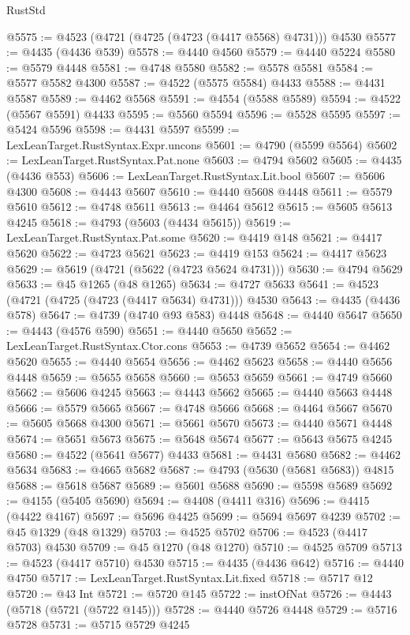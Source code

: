 \begin{lexlean}{RustStd}
\begin{coremodule}
@5575 := @4523 (@4721 (@4725 (@4723 (@4417 @5568) @4731))) @4530
@5577 := @4435 (@4436 @539)
@5578 := @4440 @4560
@5579 := @4440 @5224
@5580 := @5579 @4448
@5581 := @4748 @5580
@5582 := @5578 @5581
@5584 := @5577 @5582 @4300
@5587 := @4522 (@5575 @5584) @4433
@5588 := @4431 @5587
@5589 := @4462 @5568
@5591 := @4554 (@5588 @5589)
@5594 := @4522 (@5567 @5591) @4433
@5595 := @5560 @5594
@5596 := @5528 @5595
@5597 := @5424 @5596
@5598 := @4431 @5597
@5599 := LexLeanTarget.RustSyntax.Expr.uncons
@5601 := @4790 (@5599 @5564)
@5602 := LexLeanTarget.RustSyntax.Pat.none
@5603 := @4794 @5602
@5605 := @4435 (@4436 @553)
@5606 := LexLeanTarget.RustSyntax.Lit.bool
@5607 := @5606 @4300
@5608 := @4443 @5607
@5610 := @4440 @5608 @4448
@5611 := @5579 @5610
@5612 := @4748 @5611
@5613 := @4464 @5612
@5615 := @5605 @5613 @4245
@5618 := @4793 (@5603 (@4434 @5615))
@5619 := LexLeanTarget.RustSyntax.Pat.some
@5620 := @4419 @148
@5621 := @4417 @5620
@5622 := @4723 @5621
@5623 := @4419 @153
@5624 := @4417 @5623
@5629 := @5619 (@4721 (@5622 (@4723 @5624 @4731)))
@5630 := @4794 @5629
@5633 := @45 @1265 (@48 @1265)
@5634 := @4727 @5633
@5641 := @4523 (@4721 (@4725 (@4723 (@4417 @5634) @4731))) @4530
@5643 := @4435 (@4436 @578)
@5647 := @4739 (@4740 @93 @583) @4448
@5648 := @4440 @5647
@5650 := @4443 (@4576 @590)
@5651 := @4440 @5650
@5652 := LexLeanTarget.RustSyntax.Ctor.cons
@5653 := @4739 @5652
@5654 := @4462 @5620
@5655 := @4440 @5654
@5656 := @4462 @5623
@5658 := @4440 @5656 @4448
@5659 := @5655 @5658
@5660 := @5653 @5659
@5661 := @4749 @5660
@5662 := @5606 @4245
@5663 := @4443 @5662
@5665 := @4440 @5663 @4448
@5666 := @5579 @5665
@5667 := @4748 @5666
@5668 := @4464 @5667
@5670 := @5605 @5668 @4300
@5671 := @5661 @5670
@5673 := @4440 @5671 @4448
@5674 := @5651 @5673
@5675 := @5648 @5674
@5677 := @5643 @5675 @4245
@5680 := @4522 (@5641 @5677) @4433
@5681 := @4431 @5680
@5682 := @4462 @5634
@5683 := @4665 @5682
@5687 := @4793 (@5630 (@5681 @5683)) @4815
@5688 := @5618 @5687
@5689 := @5601 @5688
@5690 := @5598 @5689
@5692 := @4155 (@5405 @5690)
@5694 := @4408 (@4411 @316)
@5696 := @4415 (@4422 @4167)
@5697 := @5696 @4425
@5699 := @5694 @5697 @4239
@5702 := @45 @1329 (@48 @1329)
@5703 := @4525 @5702
@5706 := @4523 (@4417 @5703) @4530
@5709 := @45 @1270 (@48 @1270)
@5710 := @4525 @5709
@5713 := @4523 (@4417 @5710) @4530
@5715 := @4435 (@4436 @642)
@5716 := @4440 @4750
@5717 := LexLeanTarget.RustSyntax.Lit.fixed
@5718 := @5717 @12
@5720 := @43 Int
@5721 := @5720 @145
@5722 := instOfNat
@5726 := @4443 (@5718 (@5721 (@5722 @145)))
@5728 := @4440 @5726 @4448
@5729 := @5716 @5728
@5731 := @5715 @5729 @4245

\end{coremodule}
\end{lexlean}
